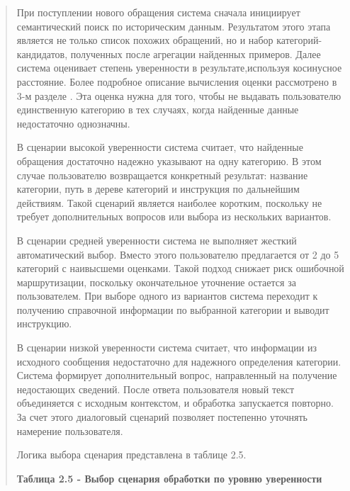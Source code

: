 \documentclass[
]{article}
\begin{document}
\begin{quote}
При поступлении нового обращения система сначала инициирует
семантический поиск по историческим данным. Результатом этого этапа
является не только список похожих обращений, но и набор
категорий-кандидатов, полученных после агрегации найденных примеров.
Далее система оценивает степень уверенности в результате,используя
косинусное расстояние. Более подробное описание вычисления оценки
рассмотрено в 3-м разделе . Эта оценка нужна для того, чтобы не выдавать
пользователю единственную категорию в тех случаях, когда найденные
данные недостаточно однозначны.

В сценарии высокой уверенности система считает, что найденные обращения
достаточно надежно указывают на одну категорию. В этом случае
пользователю возвращается конкретный результат: название категории, путь
в дереве категорий и инструкция по дальнейшим действиям. Такой сценарий
является наиболее коротким, поскольку не требует дополнительных вопросов
или выбора из нескольких вариантов.

В сценарии средней уверенности система не выполняет жесткий
автоматический выбор. Вместо этого пользователю предлагается от 2 до 5
категорий с наивысшеми оценками. Такой подход снижает риск ошибочной
маршрутизации, поскольку окончательное уточнение остается за
пользователем. При выборе одного из вариантов система переходит к
получению справочной информации по выбранной категории и выводит
инструкцию.

В сценарии низкой уверенности система считает, что информации из
исходного сообщения недостаточно для надежного определения категории.
Система формирует дополнительный вопрос, направленный на получение
недостающих сведений. После ответа пользователя новый текст объединяется
с исходным контекстом, и обработка запускается повторно. За счет этого
диалоговый сценарий позволяет постепенно уточнять намерение
пользователя.

Логика выбора сценария представлена в таблице 2.5.

\textbf{Таблица 2.5 - Выбор сценария обработки по уровню уверенности}
\end{quote}
\end{document}
